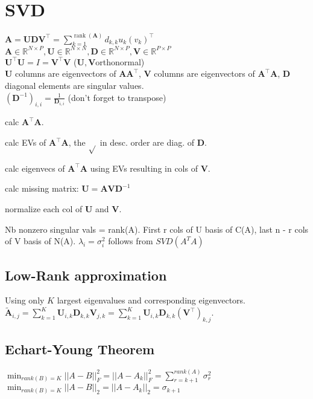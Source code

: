 \section{SVD}
$\mathbf{A} = \mathbf{U} \mathbf{D} \mathbf{V}^\top = \sum_{k=1}^{\operatorname{rank}(\mathbf{A})} d_{k,k} u_k (v_k)^\top$\\
$\mathbf{A} \in \mathbb{R}^{N \times P}, \mathbf{U} \in \mathbb{R}^{N \times N}, \mathbf{D} \in \mathbb{R}^{N \times P}, \mathbf{V} \in \mathbb{R}^{P \times P}$\\
$\mathbf{U}^\top \mathbf{U} = I = \mathbf{V}^\top \mathbf{V}$ ($\mathbf{U}, \mathbf{V}$orthonormal)\\
$\mathbf{U}$ columns are eigenvectors of $\mathbf{A} \mathbf{A}^\top$, $\mathbf{V}$ columns are eigenvectors of $\mathbf{A}^\top \mathbf{A}$, $\mathbf{D}$ diagonal elements are singular values.\\
$(\mathbf{D}^{-1})_{i,i} = \frac{1}{\mathbf{D}_{i, i}}$ (don't forget to transpose)

\begin{inparaenum}
	\item calc $\mathbf{A}^\top \mathbf{A}$.
	\item calc EVs of $\mathbf{A}^\top \mathbf{A}$, the $\sqrt{}$ in desc. order are diag. of $\mathbf{D}$.
	\item calc eigenvecs of $\mathbf{A}^\top \mathbf{A}$ using EVs resulting in cols of $\mathbf{V}$.
    \item calc missing matrix: $\mathbf{U} = \mathbf{A} \mathbf{V} \mathbf{D}^{-1}$
	\item normalize each col of $\mathbf{U}$ and $\mathbf{V}$.
\end{inparaenum}

Nb nonzero singular vals = rank(A). First r cols of U basis of C(A), last n - r cols of V basis of N(A). 
$\lambda_i = \sigma_i^2$ follows from $SVD(A^TA)$


\subsection*{Low-Rank approximation}
Using only $K$ largest eigenvalues and corresponding eigenvectors. $\tilde{\mathbf{A}}_{i, j} = \sum_{k=1}^K \mathbf{U}_{i, k} \mathbf{D}_{k,k} \mathbf{V}_{j, k} = \sum_{k=1}^K \mathbf{U}_{i, k} \mathbf{D}_{k,k} (\mathbf{V}^\top)_{k, j}$.

\subsection*{Echart-Young Theorem}
$\min_{rank(B)=K} ||A-B||_F^2 = ||A-A_k||_F^2 = \sum_{r=k+1}^{rank(A)} \sigma_r^2$
$\min_{rank(B)=K} ||A-B||_2 = ||A-A_k||_2 = \sigma_{k+1}$

